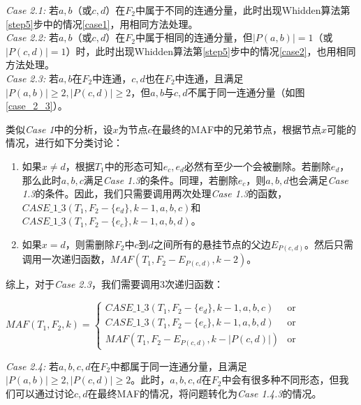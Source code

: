 
\textit{Case 2.1: }若$a,b$（或$c,d$）在$F_2$中属于不同的连通分量，此时出现Whidden算法第\ref{step5}步中的情况\ref{case1}，用相同方法处理。\\

\textit{Case 2.2: }若$a,b$（或$c,d$）在$F_2$中属于相同的连通分量，但$|P(a,b)|=1$（或$|P(c,d)|=1$）时，此时出现Whidden算法第\ref{step5}步中的情况\ref{case2}，也用相同方法处理。\\

\textit{Case 2.3: }若$a,b$在$F_2$中连通，$c,d$也在$F_2$中连通，且满足$|P(a,b)| \ge 2,|P(c,d)| \ge 2$，但$a,b$与$c,d$不属于同一连通分量（如图\ref{case_2_3}）。

类似\textit{Case 1}中的分析，设$x$为节点$c$在最终的MAF中的兄弟节点，根据节点$x$可能的情况，进行如下分类讨论：
\begin{enumerate}
	\item 如果$x \neq d$，根据$T_1$中的形态可知$e_c,e_d$必然有至少一个会被删除。若删除$e_d$，那么此时$a,b,c$满足\textit{Case 1.3}的条件。同理，若删除$e_c$，则$a,b,d$也会满足\textit{Case 1.3}的条件。因此，我们只需要调用两次处理\textit{Case 1.3}的函数，$CASE\_1\_3(T_1,F_2-\{e_d\},k-1,a,b,c)$和$CASE\_1\_3(T_1,F_2-\{e_c\},k-1,a,b,d)$。
	\item 如果$x = d$，则需删除$F_2$中$c$到$d$之间所有的悬挂节点的父边$E_{P(c,d)}$。然后只需调用一次递归函数，$MAF(T_1,F_2-E_{P(c,d)},k-2)$。
\end{enumerate}

综上，对于\textit{Case 2.3}，我们需要调用3次递归函数：
\begin{center}
$MAF(T_1,F_2,k) = \left\{
\begin{array}{lr}
         CASE\_1\_3(T_1,F_2-\{e_d\},k-1,a,b,c) & \mbox{or}\\ 
         CASE\_1\_3(T_1,F_2-\{e_c\},k-1,a,b,d) & \mbox{or}\\
         MAF(T_1,F_2-E_{P(c,d)},k-|P(c,d)|) & \mbox{or}
\end{array}
\right.$
\end{center}
$ $\\

\textit{Case 2.4: }若$a,b,c,d$在$F_2$中都属于同一连通分量，且满足$|P(a,b)| \ge 2,|P(c,d)| \ge 2$。此时，$a,b,c,d$在$F_2$中会有很多种不同形态，但我们可以通过讨论$c,d$在最终MAF的情况，将问题转化为\textit{Case 1.4.3}的情况。

